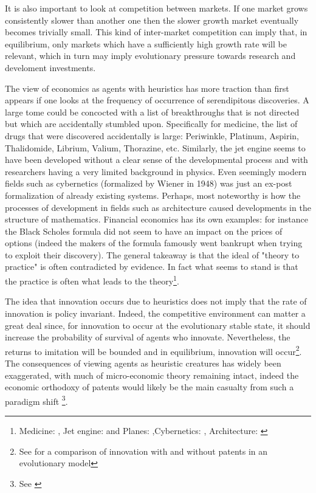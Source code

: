 It is also important to look at competition between markets. If one market grows consistently slower than another one then the slower growth market eventually becomes trivially small. This kind of inter-market competition can imply that, in equilibrium, only markets which have a sufficiently high growth rate will be relevant, which in turn may imply evolutionary pressure towards research and develoment investments. 

The view of economics as agents with heuristics has more traction than first appears if one looks at the frequency of occurrence of serendipitous discoveries. A large tome could be concocted with a list of breakthroughs that is not directed but which are accidentally stumbled upon. Specifically for medicine, the list of drugs that were discovered accidentally is large: Periwinkle, Platinum, Aspirin, Thalidomide, Librium, Valium, Thorazine, etc. Similarly, the jet engine seems to have been developed without a clear sense of the developmental process and with researchers having a very limited background in physics. Even seemingly modern fields such as cybernetics (formalized by Wiener in 1948) was just an ex-post formalization of already existing systems. Perhaps, most noteworthy is how the processes of development in fields such as architecture caused developments in the structure of mathematics. Financial economics has its own examples: for instance the Black Scholes formula did not seem to have an impact on the prices of options (indeed the makers of the formula famously went bankrupt when trying to exploit their discovery). The general takeaway is that the ideal of "theory to practice" is often contradicted by evidence. In fact what seems to stand is that the practice is often what leads to the theory\footnote{ Medicine: \cite{meyers2007happy}, Jet engine: \cite{scranton2006urgency} and Planes: \cite{meyer2013airplane},Cybernetics: \cite{mindell2002between}, Architecture: \cite{unguru1992guy}}.

The idea that innovation occurs due to heuristics does not imply that the rate of innovation is policy invariant. Indeed, the competitive environment can matter a great deal since, for innovation to occur at the evolutionary stable state, it should increase the probability of survival of agents who innovate. Nevertheless, the returns to imitation will be bounded and in equilibrium, innovation will occur\footnote{See \cite{Winter1993} for a comparison of innovation with and without patents in an evolutionary model}. The consequences of viewing agents as heuristic creatures has widely been exaggerated, with much of micro-economic theory remaining intact, indeed the economic orthodoxy of patents would likely be the main casualty from such a paradigm shift \footnote{See \cite{becker1962irrational}}.

